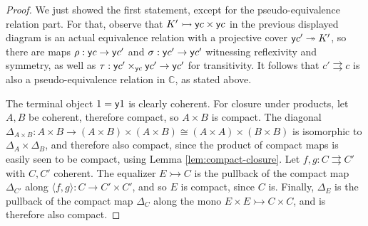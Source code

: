 \documentclass[a4paper,11pt]{amsart}
\newcommand{\covers}{\twoheadrightarrow}
\newcommand{\Cc}{\mathbb{C}}
\begin{document}
\begin{proof}
We just showed the first statement, except for the pseudo-equivalence relation part.  For that, observe that $K'\rightarrowtail \mathsf{y} c \times\mathsf{y} c$ in the previous displayed diagram is an actual equivalence relation with a projective cover $\yo c' \covers K'$, so there are maps $\rho : \mathsf{y} c \to \mathsf{y} c'$ and $\sigma : \mathsf{y} c' \to \mathsf{y} c'$ witnessing reflexivity and symmetry, as well as $\tau : \mathsf{y} c' \times_{\mathsf{y} c} \mathsf{y} c' \to \mathsf{y} c'$ for transitivity.  It follows that $c' \rightrightarrows c$ is also a pseudo-equivalence relation in $\Cc$, as stated above.

The terminal object $1=\mathsf{y} 1$ is clearly coherent.  For closure under products, let $A, B$ be coherent, therefore compact, so $A\times B$ is compact.  The diagonal $\Delta_{A\times B} : A\times B \to (A\times B) \times (A\times B) \cong (A\times A) \times (B\times B)$ is isomorphic to $\Delta_A\times \Delta_B$, and therefore also compact, since the product of compact maps is easily seen to be compact, using Lemma \ref{lem:compact-closure}.  Let $f, g : C \rightrightarrows C'$ with $C, C'$ coherent.  The equalizer $E \rightarrowtail C$ is the pullback of the compact map $\Delta_{C'}$ along $\langle f,g\rangle : C \to C'\times C'$, and so $E$ is compact, since $C$ is.  Finally, $\Delta_E$ is the pullback of the compact map $\Delta_C$ along the mono $E\times E \rightarrowtail C\times C$, and is therefore also compact.
%
\end{proof}
\end{document}
